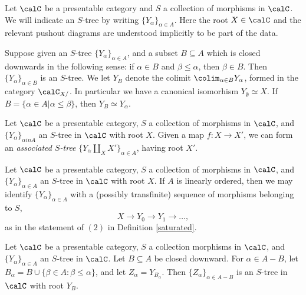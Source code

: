 \begin{notation}
Let $\calC$ be a presentable category and $S$ a collection of morphisms in $\calC$. We will
indicate an $S$-tree by writing $\{ Y_{\alpha} \}_{\alpha \in A}$. Here the root $X \in \calC$ and the relevant pushout diagrams are understood implicitly to be part of the data.

Suppose given an $S$-tree $\{ Y_{\alpha} \}_{\alpha \in A}$, and a subset $B \subseteq A$ which is closed downwards in the following sense: if $\alpha \in B$ and $\beta \leq \alpha$, then $\beta \in B$. Then $\{ Y_{\alpha} \}_{\alpha \in B}$ is an $S$-tree. We let $Y_{B}$ denote the colimit
$\colim_{\alpha \in B} Y_{\alpha}$, formed in the category $\calC_{X/}$. In particular we have a canonical isomorhism
$Y_{\emptyset} \simeq X$. If $B = \{ \alpha \in A| \alpha \leq \beta \}$, then $Y_{B} \simeq Y_{\alpha}$. 
\end{notation}

\begin{remark}\label{asstree}
Let $\calC$ be a presentable category, $S$ a collection of morphisms in $\calC$, and
$\{ Y_{\alpha} \}_{ \alpha in A}$ an $S$-tree in $\calC$ with root $X$. Given a map
$f: X \rightarrow X'$, we can form an {\it associated $S$-tree}
$ \{ Y_{\alpha} \coprod_{X} X' \}_{\alpha \in A}$, having root $X'$.
\end{remark}

\begin{example}
Let $\calC$ be a presentable category, $S$ a collection of morphisms in $\calC$, and
$\{ Y_{\alpha} \}_{\alpha \in A}$ an $S$-tree in $\calC$ with root $X$. If $A$ is linearly ordered, then we may identify $\{ Y_{\alpha} \}_{\alpha \in A}$ with a (possibly transfinite) sequence of morphisms belonging to $S$,
$$ X \rightarrow Y_0 \rightarrow Y_1 \rightarrow \ldots, $$
as in the statement of $(2)$ in Definition \ref{saturated}.
\end{example}

\begin{remark}\label{relci}
Let $\calC$ be a presentable category, $S$ a collection morphisms in $\calC$, and
$\{Y_{\alpha} \}_{\alpha \in A}$ an $S$-tree in $\calC$. Let $B \subseteq A$ be closed downward. 
For $\alpha \in A - B$, let $B_{\alpha} = B \cup \{ \beta \in A: \beta \leq \alpha \}$, and let
$Z_{\alpha} = Y_{B_{\alpha}}$. Then $ \{ Z_{\alpha} \}_{ \alpha \in A-B}$ is an $S$-tree in
$\calC$ with root $Y_{B}$.
\end{remark}

